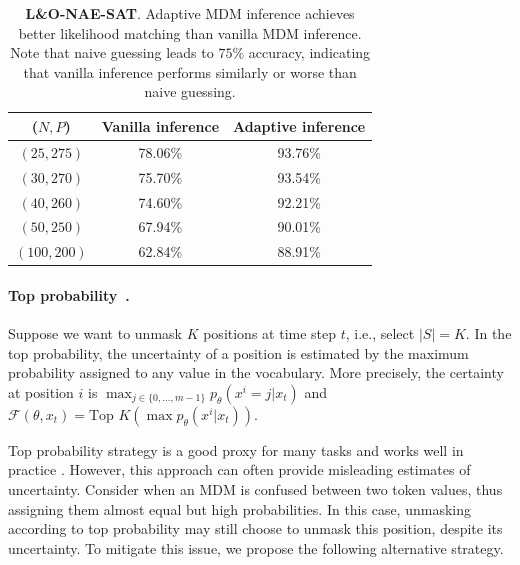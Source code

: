 \documentclass{article}
\theoremstyle{plain}
\theoremstyle{definition}
\theoremstyle{remark}
\begin{document}
\begin{table}[h]
    \centering 
    \caption{\textbf{L\&O-NAE-SAT}. Adaptive MDM inference achieves better likelihood matching than vanilla MDM inference. Note that naive guessing leads to $75\%$ accuracy, indicating that vanilla inference performs similarly or worse than naive guessing.}
    \vspace{0.1in}
    \begin{tabular}{c c c}
        \toprule
        \textbf{($N,P$)} & \textbf{Vanilla inference} & \textbf{Adaptive inference}\\
        \midrule
        $(25,275)$  & 78.06\%   & 93.76\%  \\
        $(30,270)$  & 75.70\% & 93.54\% \\
        $(40,260)$  & 74.60\%   & 92.21\%  \\
        $(50,250)$  & 67.94\% & 90.01\% \\
        $(100,200)$ & 62.84\% & 88.91\% \\
        \bottomrule
    \end{tabular}
    \label{tab:csp_sampler}
\end{table}


\paragraph{Top probability~\cite{zheng2024reparameterized}.} Suppose we want to unmask $K$ positions at time step $t$, i.e., select $|S|=K$. In the top probability, the uncertainty of a position is estimated by the maximum probability assigned to any value in the vocabulary. More precisely, the certainty at position $i$ is $\max_{j \in \{ 0, \ldots, m-1 \} } p_\theta(x^i = j | x_t)$ and \(\mathcal{F}(\theta, x_t) = \text{Top } K \left(\max p_\theta(x^i | x_t) \right)\). 

Top probability strategy is a good proxy for many tasks and works well in practice \cite{zheng2024reparameterized,ye2024beyond,wang2024diffusion}. However, this approach can often provide misleading estimates of uncertainty. Consider when an MDM is confused between two token values, thus assigning them almost equal but high probabilities.  In this case, unmasking according to top probability may still choose to unmask this position, despite its uncertainty. To mitigate this issue, we propose the following alternative strategy.
\end{document}
